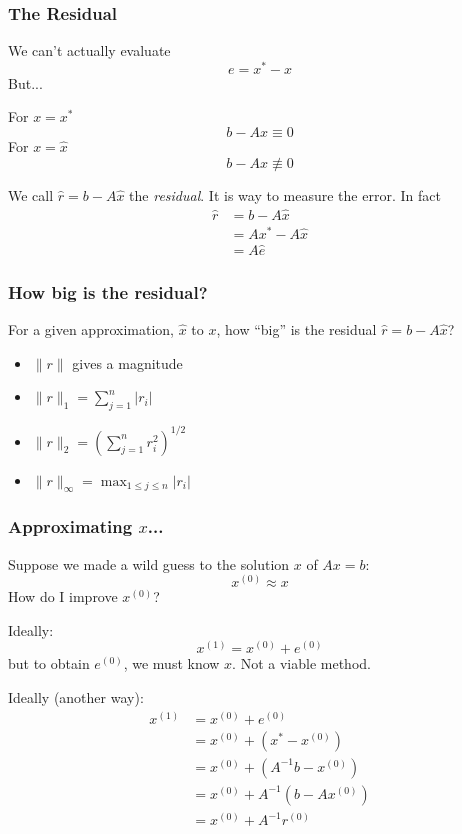 \documentclass[10pt]{beamer}
\begin{document}
\begin{frame}
\frametitle{The Residual}
We can't actually evaluate
\begin{equation*}
e = x^{*} - \hat{x}
\end{equation*}
But...
\bigskip

For $x=x^{*}$
\begin{equation*}
b-Ax \equiv 0
\end{equation*}
For $x=\hat{x}$
\begin{equation*}
b-Ax \nequiv 0
\end{equation*}

We call $\hat{r} = b-A\hat{x}$ the \emph{residual}.  It is way to measure the error.  In fact
\begin{align*}
\hat{r} &= b - A\hat{x}\\
&= Ax^{*} - A\hat{x}\\
&=A\hat{e}
\end{align*}
\end{frame}
\begin{frame}
\frametitle{How big is the residual?}
For a given approximation, $\hat{x}$ to $x$, how ``big'' is the residual $\hat{r} = b-A\hat{x}$?
\begin{itemize}
	\item $\|r\|$ gives a magnitude
	\item $\|r\|_{1} = \sum_{j=1}^{n} |r_{i}|$
	\item $\|r\|_{2} = \left( \sum_{j=1}^{n} r_{i}^{2} \right)^{1/2}$
	\item $\|r\|_{\infty} = \max_{1\leq j \leq n} |r_{i}|$
\end{itemize}
\end{frame}
\begin{frame}
\frametitle{Approximating $x$...}
Suppose we made a wild guess to the solution $x$ of $Ax=b$:
\begin{equation*}
	x^{(0)} \approx x
\end{equation*}
How do I improve $x^{(0)}$?
\bigskip

Ideally:
\begin{equation*}
	x^{(1)} = x^{(0)} + e^{(0)}
\end{equation*}
but to obtain $e^{(0)}$, we must know $x$.  Not a viable method.
\bigskip

Ideally (another way):
\begin{align*}
	x^{(1)} &= x^{(0)} + e^{(0)}\\
		     &= x^{(0)} + (x^{*} - x^{(0)})\\
		     &= x^{(0)} + (A^{-1}b - x^{(0)})\\
		     &= x^{(0)} + A^{-1}(b - A x^{(0)})\\
		     &= x^{(0)} + A^{-1} r^{(0)}
\end{align*}
\end{frame}
\end{document}
